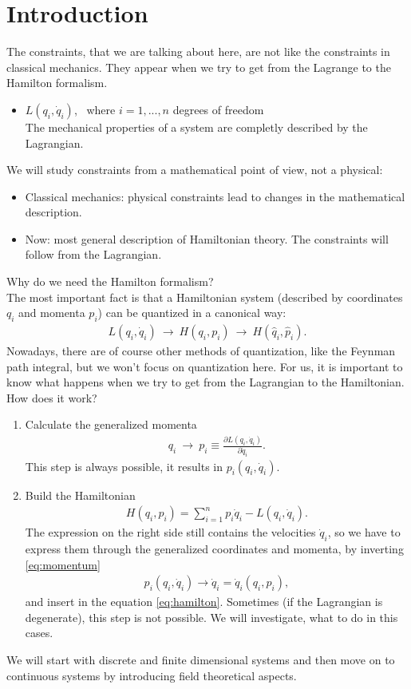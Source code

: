 \chapter{Introduction}

The constraints, that we are talking about here, are not like the constraints in classical mechanics. They appear when we try to get from the Lagrange to the Hamilton formalism. 
\begin{itemize}
\item $L(q_i,\dot{q}_i)$, \ where $i = 1, ..., n$ degrees of freedom \\
The mechanical properties of a system are completly described by the Lagrangian. 
\end{itemize}
We will study constraints from a mathematical point of view, not a physical:
\begin{itemize}
\item Classical mechanics: physical constraints lead to changes in the mathematical description.
\item Now: most general description of Hamiltonian theory. The constraints will follow from the Lagrangian.
\end{itemize}

Why do we need the Hamilton formalism? \\
The most important fact is that a Hamiltonian system (described by coordinates $q_i$ and momenta $p_i$) can be quantized in a canonical way:
\begin{align}
L(q_i,\dot{q}_i) \ \longrightarrow \ H(q_i,p_i) \ \longrightarrow \ H(\hat{q}_i,\hat{p}_i) .
\end{align}
Nowadays, there are of course other methods of quantization, like the Feynman path integral, but we won't focus on quantization here. For us, it is important to know what happens when we try to get from the Lagrangian to the Hamiltonian. \\

How does it work?
\begin{enumerate}
\item Calculate the generalized momenta
\begin{align}\label{eq:momentum}
q_i \ \longrightarrow \ p_i \equiv \frac{\partial L(q_i,\dot{q}_i)}{\partial \dot{q}_i}.
\end{align}
This step is always possible, it results in $p_i(q_i,\dot{q}_i)$.
\item Build the Hamiltonian
\begin{align}\label{eq:hamilton}
H(q_i,p_i) = \sum_{i = 1}^n p_i \dot{q}_i - L(q_i,\dot{q}_i).
\end{align}
The expression on the right side still contains the velocities $\dot{q}_i$, so we have to express them through the generalized coordinates and momenta, by inverting \eqref{eq:momentum}
\begin{align}
p_i(q_i,\dot{q}_i) \longrightarrow \dot{q}_i = \dot{q}_i(q_i,p_i),
\end{align}
and insert in the equation \eqref{eq:hamilton}. Sometimes (if the Lagrangian is degenerate), this step is not possible. We will investigate, what to do in this cases.
\end{enumerate} 

We will start with discrete and finite dimensional systems and then move on to continuous systems by introducing field theoretical aspects.